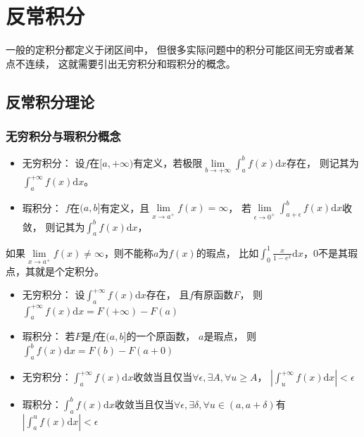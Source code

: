 
\chapter{反常积分}

一般的定积分都定义于闭区间中，
但很多实际问题中的积分可能区间无穷或者某点不连续，
这就需要引出无穷积分和瑕积分的概念。

\section{反常积分理论}

\subsection{无穷积分与瑕积分概念}

\begin{definition}[无穷积分与瑕积分]
  \begin{itemize}
  \item 无穷积分：
    设$f$在$[a,+\infty)$有定义，若极限$\lim \limits _{b \rightarrow +\infty}\int^b_af(x)\mathrm{d}x$存在，
    则记其为$\int^{+\infty}_a f(x)\mathrm{d}x$。
  \item 瑕积分：
    $f$在$(a,b]$有定义，且$\lim \limits _{x \rightarrow a^+}f(x) = \infty$，
    若$\lim \limits _{\epsilon \rightarrow 0^+}\int_{a + \epsilon}^b f(x)\mathrm{d}x $收敛，
    则记其为$\int_a^b f(x) \mathrm{d}x$，
  \end{itemize}
\end{definition}

\begin{note}
  如果$\lim \limits _{x \rightarrow a^+}f(x) \neq \infty$，则不能称$a$为$f(x)$的瑕点，
  比如$\int_0^1\frac{x}{1 - e^x}\mathrm{d}x$，$0$不是其瑕点，其就是个定积分。
\end{note}

\begin{theorem}[反常积分Leibniz公式]
  \begin{itemize}
  \item 无穷积分：
    设$\int^{+\infty}_af(x)\mathrm{d}x$存在，
    且$f$有原函数$F$，
    则$\int^{+\infty}_af(x)\mathrm{d}x = F(+\infty) - F(a)$
  \item 瑕积分：
    若$F$是$f$在$(a,b]$的一个原函数，
    $a$是瑕点，
    则$\int _a^bf(x)\mathrm{d}x = F(b) - F(a + 0)$
  \end{itemize}
\end{theorem}

\begin{theorem}[定义判敛]
  \begin{itemize}
  \item 无穷积分：$\int_a^{+\infty}f(x)\mathrm{d}x$收敛当且仅当$\forall \epsilon, \exists A, \forall u \geq A$，
    $|\int_u^{+\infty}f(x)\mathrm{d}x| < \epsilon$
  \item 瑕积分：$\int_a^bf(x)\mathrm{d}x$收敛当且仅当$\forall \epsilon, \exists \delta, \forall u \in (a,a + \delta)$有
    $|\int_a^u f(x)\mathrm{d}x| < \epsilon$
  \end{itemize}
\end{theorem}

